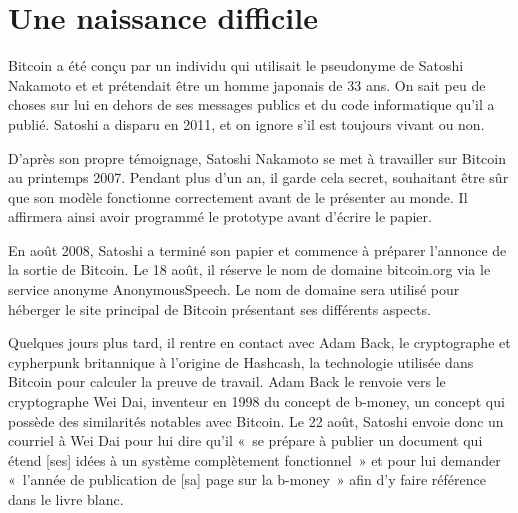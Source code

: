 \section{Une naissance difficile} 

Bitcoin a été conçu par un individu qui utilisait le pseudonyme de Satoshi Nakamoto et et prétendait être un homme japonais de 33 ans. On sait peu de choses sur lui en dehors de ses messages publics et du code informatique qu'il a publié. Satoshi a disparu en 2011, et on ignore s'il est toujours vivant ou non. 

D'après son propre témoignage, Satoshi Nakamoto se met à travailler sur Bitcoin au printemps 2007. Pendant plus d'un an, il garde cela secret, souhaitant être sûr que son modèle fonctionne correctement avant de le présenter au monde. Il affirmera ainsi avoir programmé le prototype avant d'écrire le papier.

En août 2008, Satoshi a terminé son papier et commence à préparer l'annonce de la sortie de Bitcoin. Le 18 août, il réserve le nom de domaine bitcoin.org via le service anonyme AnonymousSpeech. Le nom de domaine sera utilisé pour héberger le site principal de Bitcoin présentant ses différents aspects.

Quelques jours plus tard, il rentre en contact avec Adam Back, le cryptographe et cypherpunk britannique à l'origine de Hashcash, la technologie utilisée dans Bitcoin pour calculer la preuve de travail. Adam Back le renvoie vers le cryptographe Wei Dai, inventeur en 1998 du concept de b-money, un concept qui possède des similarités notables avec Bitcoin. Le 22 août, Satoshi envoie donc un courriel à Wei Dai pour lui dire qu'il «~se prépare à publier un document qui étend [ses] idées à un système complètement fonctionnel~» et pour lui demander «~l'année de publication de [sa] page sur la b-money~» afin d'y faire référence dans le livre blanc.

